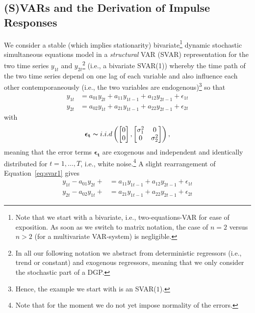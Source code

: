 \documentclass[a4paper,11pt,listof=nochaptergap,oneside,pointednumbers,bibtotoc,bigheadings,liststotoc]{scrbook}
\theoremstyle{mysatz}
\theoremstyle{mydefinition}
\theoremstyle{mybemerkung}
\newcommand{\vect}[1]{\boldsymbol{\mathbf{#1}}}
\begin{document}
\subsection{(S)VARs and the Derivation of Impulse Responses}
We consider a stable (which implies stationarity) bivariate\footnote{Note that we start with a bivariate, i.e., two-equations-VAR for ease of exposition. As soon as we switch to matrix notation, the case of $n=2$ versus $n>2$ (for a multivariate VAR-system) is negligible.} dynamic stochastic simultaneous equations model in a \textit{structural} VAR (SVAR) representation for the two time series $y_{1t}$ and $y_{2t}$\footnote{In all our following notation we abstract from deterministic regressors (i.e., trend or constant) and exogenous regressors, meaning that we only consider the stochastic part of a DGP.} (i.e., a bivariate SVAR(1)) whereby the time path of the two time series depend on one lag of each variable and also influence each other contemporaneously (i.e., the two variables are endogenous)\footnote{Hence, the example we start with is an SVAR($1$).} so that
\begin{equation} \label{eq:svar1}
\begin{split}
	y_{1t} & = a_{01}y_{2t} + a_{11}y_{1t-1} + a_{12}y_{2t-1} + \epsilon_{1t} \\
	y_{2t} & = a_{02}y_{1t} + a_{21}y_{1t-1} + a_{22}y_{2t-1} + \epsilon_{2t}
\end{split}								
\end{equation}
with 
\begin{equation}
\begin{split}
	\vect{\epsilon_t} \thicksim i.i.d \left (  \begin{bmatrix}
    							0 \\
    							0
 							 \end{bmatrix}, \begin{bmatrix}
    							\sigma_{1}^2 & 0  \\
    							0 & \sigma_{2}^2
 							 \end{bmatrix} \right ),
\end{split}								
\end{equation}
meaning that the error terms $\vect{\epsilon_t}$ are exogenous and independent and identically distributed  for $t = 1, \dots, T$, i.e., white noise.\footnote{Note that for the moment we do not yet impose normality of the errors.} A slight rearrangement of Equation~\ref{eq:svar1} gives 
\begin{equation} \label{eq:svar2}
\begin{split}
	y_{1t} - a_{01}y_{2t} + & = a_{11}y_{1t-1} + a_{12}y_{2t-1} + \epsilon_{1t} \\
	y_{2t} - a_{02}y_{1t} +  & = a_{21}y_{1t-1} + a_{22}y_{2t-1} + \epsilon_{2t}
\end{split}								
\end{equation}
\end{document}

